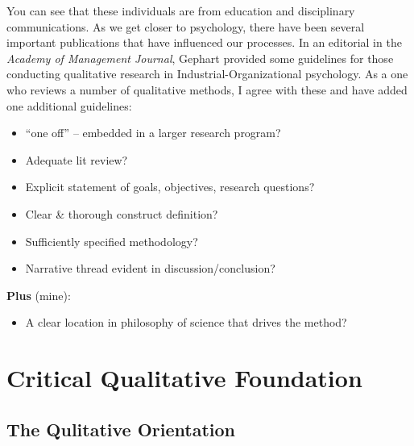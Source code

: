 \documentclass[
  english,
]{book}
\providecommand{\tightlist}{%
  \setlength{\itemsep}{0pt}\setlength{\parskip}{0pt}}
\begin{document}
You can see that these individuals are from education and disciplinary communications. As we get closer to psychology, there have been several important publications that have influenced our processes. In an editorial in the \emph{Academy of Management Journal}, Gephart \citeyearpar{gephart_qualitative_2004} provided some guidelines for those conducting qualitative research in Industrial-Organizational psychology. As a one who reviews a number of qualitative methods, I agree with these and have added one additional guidelines:

\begin{itemize}
\tightlist
\item
  ``one off'' -- embedded in a larger research program?
\item
  Adequate lit review?
\item
  Explicit statement of goals, objectives, research questions?
\item
  Clear \& thorough construct definition?
\item
  Sufficiently specified methodology?
\item
  Narrative thread evident in discussion/conclusion?
\end{itemize}

\textbf{Plus} (mine):

\begin{itemize}
\tightlist
\item
  A clear location in philosophy of science that drives the method?
\end{itemize}

\hypertarget{critical-qualitative-foundation}{%
\section{Critical Qualitative Foundation}\label{critical-qualitative-foundation}}

\hypertarget{the-qulitative-orientation}{%
\subsection{The Qulitative Orientation}\label{the-qulitative-orientation}}
\end{document}
